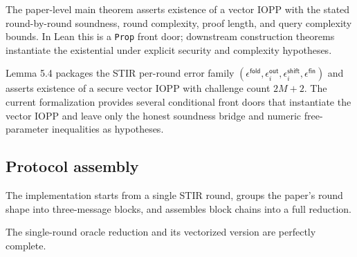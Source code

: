 \begin{theorem}\label{thm:stir}
    The paper-level main theorem asserts existence of a vector IOPP with the stated
    round-by-round soundness, round complexity, proof length, and query complexity bounds.
    In Lean this is a \texttt{Prop} front door; downstream construction theorems instantiate
    the existential under explicit security and complexity hypotheses.
\end{theorem}

\begin{lemma}\label{lemma:rnd_by_rnd_soundness}
    Lemma 5.4 packages the STIR per-round error family
    $(\epsilon^{\mathsf{fold}},\epsilon^{\mathsf{out}}_i,
    \epsilon^{\mathsf{shift}}_i,\epsilon^{\mathsf{fin}})$ and asserts existence of a secure
    vector IOPP with challenge count $2M+2$.  The current formalization provides several
    conditional front doors that instantiate the vector IOPP and leave only the honest
    soundness bridge and numeric free-parameter inequalities as hypotheses.
\end{lemma}

\subsection{Protocol assembly}\label{sec:stir_protocol_assembly}

\begin{definition}\label{def:stir_round_reductions}
    The implementation starts from a single STIR round, groups the paper's round shape into
    three-message blocks, and assembles block chains into a full reduction.
\end{definition}

\begin{theorem}\label{thm:stir_round_completeness}
    The single-round oracle reduction and its vectorized version are perfectly complete.
\end{theorem}

